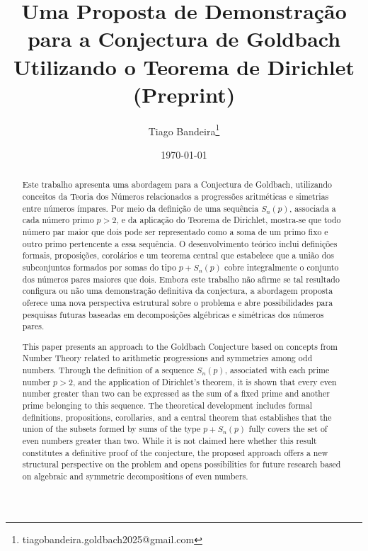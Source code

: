 \documentclass[a4paper,11pt]{article}
\title{\textbf{Uma Proposta de Demonstração para a Conjectura de Goldbach Utilizando o Teorema de Dirichlet}\\
	\large (Preprint)}
\author{
	Tiago Bandeira\thanks{tiagobandeira.goldbach2025@gmail.com} 
}
\date{\today}
\theoremstyle{definition}
\theoremstyle{remark}
\begin{document}
	
	\maketitle
	\begin{otherlanguage}{brazil}
	\begin{abstract}
		Este trabalho apresenta uma abordagem para a Conjectura de Goldbach, utilizando conceitos da Teoria dos Números relacionados a progressões aritméticas e simetrias entre números ímpares. Por meio da definição de uma sequência \(S_n(p)\), associada a cada número primo \(p > 2\), e da aplicação do Teorema de Dirichlet, mostra-se que todo número par maior que dois pode ser representado como a soma de um primo fixo e outro primo pertencente a essa sequência. O desenvolvimento teórico inclui definições formais, proposições, corolários e um teorema central que estabelece que a união dos subconjuntos formados por somas do tipo \(p + S_n(p)\) cobre integralmente o conjunto dos números pares maiores que dois. Embora este trabalho não afirme se tal resultado configura ou não uma demonstração definitiva da conjectura, a abordagem proposta oferece uma nova perspectiva estrutural sobre o problema e abre possibilidades para pesquisas futuras baseadas em decomposições algébricas e simétricas dos números pares.
	\end{abstract}
	\end{otherlanguage}
	

	\begin{abstract}
		This paper presents an approach to the Goldbach Conjecture based on concepts from Number Theory related to arithmetic progressions and symmetries among odd numbers. Through the definition of a sequence \(S_n(p)\), associated with each prime number \(p > 2\), and the application of Dirichlet's theorem, it is shown that every even number greater than two can be expressed as the sum of a fixed prime and another prime belonging to this sequence. The theoretical development includes formal definitions, propositions, corollaries, and a central theorem that establishes that the union of the subsets formed by sums of the type \(p + S_n(p)\) fully covers the set of even numbers greater than two. While it is not claimed here whether this result constitutes a definitive proof of the conjecture, the proposed approach offers a new structural perspective on the problem and opens possibilities for future research based on algebraic and symmetric decompositions of even numbers.	
	\end{abstract}
	
\end{document}
